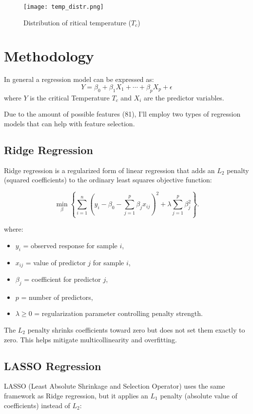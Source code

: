 \documentclass[conference]{IEEEtran}
\begin{document}
\begin{figure}[h]
    \centering
    \texttt{[image: temp\_distr.png]}
    \caption{Distribution of ritical temperature ($T_c$)}
    \label{fig:tc_distribution}
\end{figure}

\section{Methodology}
\noindent In general a regression model can be expressed as:
\[
Y = \beta_0 + \beta_1X_1 + \cdots + \beta_pX_p + \epsilon
\]
where $Y$ is the critical Temperature $T_c$ and $X_i$ are the predictor variables.

Due to the amount of possible features (81), I'll employ two types of regression models that can help with feature selection.
\subsection{Ridge Regression}
Ridge regression is a regularized form of linear regression that adds an $L_2$ penalty (squared coefficients) to the ordinary least squares objective function:

\[
\min_{\beta} \left\{ \sum_{i=1}^{n} \left(y_i - \beta_0 - \sum_{j=1}^{p} \beta_j x_{ij}\right)^2 
+ \lambda \sum_{j=1}^{p} \beta_j^2 \right\}.
\]

where:
\begin{itemize}
    \item $y_i$ = observed response for sample $i$,
    \item $x_{ij}$ = value of predictor $j$ for sample $i$,
    \item $\beta_j$ = coefficient for predictor $j$,
    \item $p$ = number of predictors,
    \item $\lambda \geq 0$ = regularization parameter controlling penalty strength.
\end{itemize}

The $L_2$ penalty shrinks coefficients toward zero but does not set them exactly to zero. This helps mitigate multicollinearity and overfitting.

\subsection{LASSO Regression}
LASSO (Least Absolute Shrinkage and Selection Operator) uses the same framework as Ridge regression, but it applies an $L_1$ penalty (absolute value of coefficients) instead of $L_2$:
\end{document}
